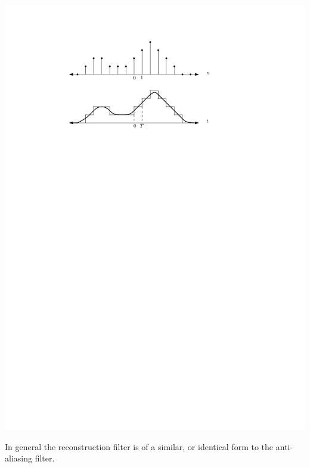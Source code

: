 \begin{center}
  \includegraphics[scale=1]{graphics/sinc-interp.pdf}
\end{center}

In general the reconstruction filter is of a similar, or identical form to the anti-aliasing filter.
